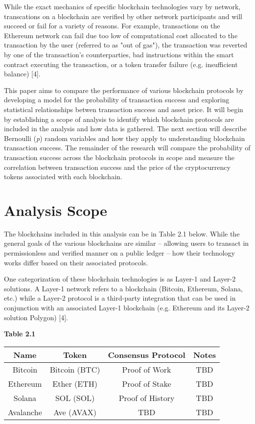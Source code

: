 \documentclass[12pt]{article}
\begin{document}
While the exact mechanics of specific blockchain technologies vary by network, transcations on a blockchain are verified by other network participants and will succeed or fail for a variety of reasons. For example, transactions on the Ethereum network can fail due too low of computational cost allocated to the transaction by the user (referred to as "out of gas"), the transaction was reverted by one of the transaction's counterparties, bad instructions within the smart contract executing the transaction, or a token transfer failure (e.g. insufficient balance) [4].

This paper aims to compare the performance of various blockchain protocols by developing a model for the probability of transaction success and exploring statistical relationships betwen transaction success and asset price. It will begin by establishing a scope of analysis to identify which blockchain protocols are included in the analysis and how data is gathered. The next section will describe Bernoulli (\emph{p}) random variables and how they apply to understanding blockchain transaction success. The remainder of the research will compare the probability of transaction success across the blockchain protocols in scope and measure the correlation between transaction success and the price of the cryptocurrency tokens associated with each blockchain.

\section{Analysis Scope}
The blockchains included in this analysis can be in Table 2.1 below. While the general goals of the various blockchains are similar -- allowing users to transact in permissionless and verified manner on a public ledger -- how their technology works differ based on their associated protocols.

One categorization of these blockchain technologies is as Layer-1 and Layer-2 solutions. A Layer-1 network refers to a blockchain (Bitcoin, Ethereum, Solana, etc.) while a Layer-2 protocol is a third-party integration that can be used in conjunction with an associated Layer-1 blockchain (e.g. Ethereum and its Layer-2 solution Polygon) [4].

\textbf{Table 2.1}\\
\begin{tabular}{| c | c | c | c |}
\hline
Name & Token & Consensus Protocol & Notes\\
\hline
Bitcoin & Bitcoin (BTC) & Proof of Work & TBD\\
Ethereum & Ether (ETH) & Proof of Stake & TBD\\
Solana & SOL (SOL) & Proof of History & TBD\\
Avalanche & Ave (AVAX) & TBD & TBD\\
\hline
\end{tabular}
\end{document}
